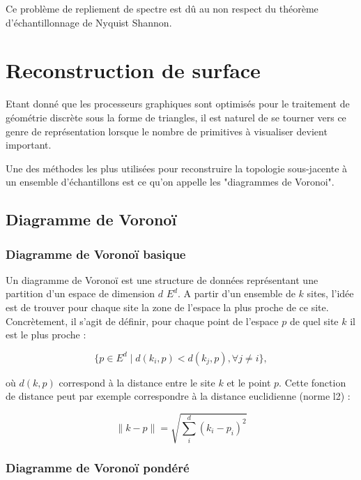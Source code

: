 \documentclass{report}
\newcommand{\norm}[1]{\left\lVert#1\right\rVert}
\begin{document}
Ce problème de repliement de spectre est dû au non respect du théorème d'échantillonnage de Nyquist Shannon.

\chapter{Reconstruction de surface}

Etant donné que les processeurs graphiques sont optimisés pour le traitement de géométrie discrète sous la forme de triangles, il est naturel de se tourner vers ce genre de représentation lorsque le nombre de primitives à visualiser devient important.

Une des méthodes les plus utilisées pour reconstruire la topologie sous-jacente à un ensemble d'échantillons est ce qu'on appelle les "diagrammes de Voronoi".

\section{Diagramme de Voronoï}

\subsection{Diagramme de Voronoï basique}

Un diagramme de Voronoï est une structure de données représentant une partition d'un espace de dimension $d$ $E^d$.
A partir d'un ensemble de $k$ sites, l'idée est de trouver pour chaque site la zone de l'espace la plus proche de ce site.
Concrètement, il s'agit de définir, pour chaque point de l'espace $p$ de quel site $k$ il est le plus proche :

\begin{equation}
  \{p \in E^d \mid d(k_i, p) < d(k_j, p), \forall j \neq i\},
\end{equation}

où $d(k,p)$ correspond à la distance entre le site $k$ et le point $p$. Cette fonction de distance peut par exemple correspondre à la distance euclidienne (norme l2) :

\begin{equation}
  \norm{k-p} = \sqrt{\sum_i^d (k_i-p_i)^2}
\end{equation}

\subsection{Diagramme de Voronoï pondéré}



\end{document}
